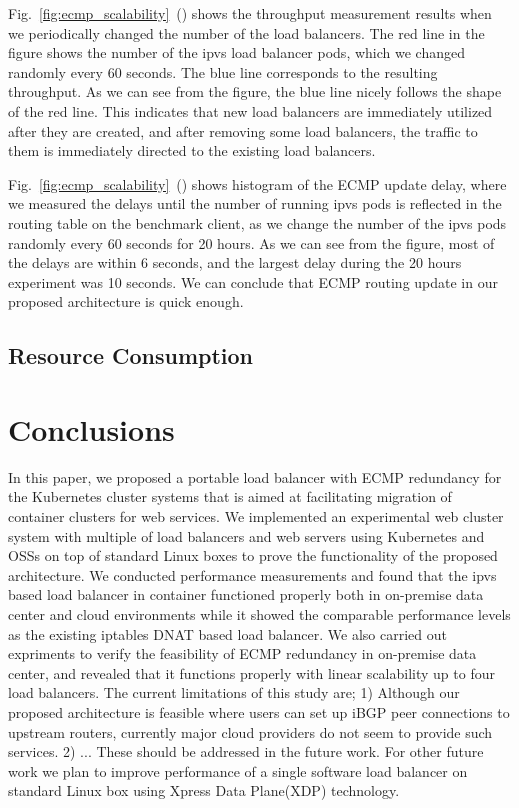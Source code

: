 Fig.~\ref{fig:ecmp_scalability}~() shows the throughput measurement results when we periodically changed the number of the load balancers. 
The red line in the figure shows the number of the ipvs load balancer pods, which we changed randomly every 60 seconds.
The blue line corresponds to the resulting throughput.
As we can see from the figure, the blue line nicely follows the shape of the red line.
This indicates that new load balancers are immediately utilized after they are created, and after removing some load balancers, the traffic to them is immediately directed to the existing load balancers.

Fig.~\ref{fig:ecmp_scalability}~() shows histogram of the ECMP update delay, where we measured the delays until the number of running ipvs pods is reflected in the routing table on the benchmark client, as we change the number of the ipvs pods randomly every 60 seconds for 20 hours.
As we can see from the figure, most of the delays are within 6 seconds, and the largest delay during the 20 hours experiment was 10 seconds.
We can conclude that ECMP routing update in our proposed architecture is quick enough.

\FloatBarrier

\subsection{Resource Consumption}

\section{Conclusions}\label{Conclusions}

In this paper, we proposed a portable load balancer with ECMP redundancy for the Kubernetes cluster systems that is aimed at facilitating migration of container clusters for web services.
We implemented an experimental web cluster system with multiple of load balancers and web servers using Kubernetes and OSSs on top of standard Linux boxes to prove the functionality of the proposed architecture.
We conducted performance measurements and found that the ipvs based load balancer in container functioned properly both in on-premise data center and cloud environments while it showed the comparable performance levels as the existing iptables DNAT based load balancer.
We also carried out expriments to verify the feasibility of ECMP redundancy in on-premise data center, and revealed that it functions properly with linear scalability up to four load balancers.
The current limitations of this study are; 
1) Although our proposed architecture is feasible where users can set up iBGP peer connections to upstream routers, currently major cloud providers do not seem to provide such services.
2) ...
These should be addressed in the future work.
For other future work we plan to improve performance of a single software load balancer on standard Linux box using Xpress Data Plane(XDP) technology. 



